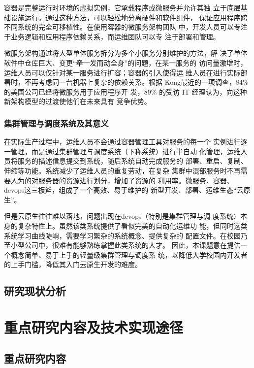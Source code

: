 \documentclass{article}
\begin{document}
  容器是完整运行时环境的虚拟实例，它承载程序或微服务并允许其独
立于底层基础设施运行。通过这种方法，可以轻松地分离硬件和软件组件，
保证应用程序跨不同系统的完全可移植性。在使用容器的微服务架构团队
中，开发人员可以专注于业务逻辑和应用程序依赖关系，而运维团队可以专
注于部署和管理。

  微服务架构通过将大型单体服务拆分为多个小服务分别维护的方法，解
决了单体软件中仓库巨大、变更“牵一发而动全身”的问题，在某一服务的
访问量激增时，运维人员可以仅针对某一服务进行扩容；容器的引入使得运
维人员在进行实际部署时，不再考虑同一台机器上复杂的依赖关系。根据
Kong最近的一项调查\cite{kongMicroserviceRepoert}，84\% 的美国公司已经将微服务用于应用程序开
发，89\% 的受访 IT 经理认为，向这种新架构模型的过渡使他们在未来具有
竞争优势。

\subsubsection{集群管理与调度系统及其意义}
  在实际生产过程中，运维人员不会通过容器管理工具对服务的每一个
实例进行逐一管理，而是通过集群管理与调度系统（下称系统）进行半自动
化管理，运维人员将服务的描述信息提交到系统，随后系统自动完成服务的
部署、重启、复制、伸缩等功能。系统减少了运维人员的重复劳动，在复杂
集群中混部服务时不再需要人为的对服务器的资源进行划分，增加了资源的
利用率。微服务、容器、devops这三板斧，组成了一个高效、易于维护的
新型开发、部署、运维生态“云原生”。

  但是云原生往往难以落地，问题出现在devops（特别是集群管理与调
度系统）本身的复杂特性上。虽然该类系统提供了看似完美的自动化运维功
能，但同时这类系统学习曲线陡峭，需要学习繁杂的系统概念、提供复杂的
配置文件。在校园乃至小型公司中，很难有能够熟练掌握此类系统的人才。
因此，本课题意在提供一个概念简单、易于上手的轻量级集群管理与调度系
统，以降低大学校园内开发者的上手门槛，降低其入门云原生开发的难度。

\subsection{研究现状分析}

\section{重点研究内容及技术实现途径}

\subsection{重点研究内容}
\end{document}
